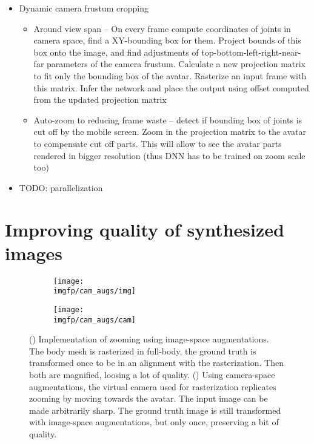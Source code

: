 \begin{itemize}
\begin{itemize}
	\end{itemize}
	\item Dynamic camera frustum cropping
		\begin{itemize}
			\item Around view span -- On every frame compute coordinates of joints in camera space, find a XY-bounding box for them. Project bounds of this box onto the image, and find adjustments of top-bottom-left-right-near-far parameters of the camera frustum. Calculate a new projection matrix to fit only the bounding box of the avatar. Rasterize an input frame with this matrix. Infer the network and place the output using offset computed from the updated projection matrix
			\item Auto-zoom to reducing frame waste -- detect if bounding box of joints is cut off by the mobile screen. Zoom in the projection matrix to the avatar to compensate cut off parts. This will allow to see the avatar parts rendered in bigger resolution (thus DNN has to be trained on zoom scale too)
		\end{itemize}
	
	\item \alert{TODO: parallelization}
\end{itemize}

\section{Improving quality of synthesized images}\label{methods:zooms}
\begin{figure}
	\centering
	\begin{subfigure}[b]{0.48\textwidth}
		\centering
		\texttt{[image: \\imgfp/cam\_augs/img]}%
		\caption{}
		\label{fig:cam_aug:before}
	\end{subfigure}
	\begin{subfigure}[b]{0.48\textwidth}
		\centering
		\texttt{[image: \\imgfp/cam\_augs/cam]}%
		\caption{}
		\label{fig:cam_aug:after}
	\end{subfigure}
	\caption{(\protect{}) Implementation of zooming using image-space augmentations. The body mesh is rasterized in full-body, the ground truth is transformed once to be in an alignment with the rasterization. Then both are magnified, loosing a lot of quality. (\protect{}) Using camera-space augmentations, the virtual camera used for rasterization replicates zooming by moving towards the avatar. The input image can be made arbitrarily sharp. The ground truth image is still transformed with image-space augmentations, but only once, preserving a bit of quality. }
	\label{fig:cam_aug}
\end{figure}

